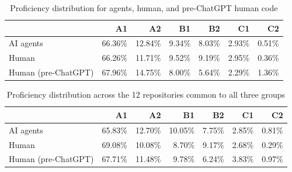\begin{table}[tb]
\centering
\caption{Proficiency distribution for agents, human, and pre-ChatGPT human code}
\label{tab:ai-vs-human-same-projects}
\begin{tabular}{l r r r r r r}
\toprule
 & A1 & A2 & B1 & B2 & C1 & C2 \\
\midrule
AI agents & 66.36\% & 12.84\% & 9.34\% & 8.03\% & 2.93\% & 0.51\% \\
Human & 66.26\% & 11.71\% & 9.52\% & 9.19\% & 2.95\% & 0.36\% \\
Human (pre-ChatGPT) & 67.96\% & 14.75\% & 8.00\% & 5.64\% & 2.29\% & 1.36\% \\
\bottomrule
\end{tabular}
\end{table}


\begin{table}[tb]
\centering
\caption{Proficiency distribution across the 12 repositories common to all three groups}
\label{tab:ai-vs-human-common}
\begin{tabular}{l r r r r r r}
\toprule
 & A1 & A2 & B1 & B2 & C1 & C2 \\
\midrule
AI agents & 65.83\% & 12.70\% & 10.05\% & 7.75\% & 2.85\% & 0.81\% \\
Human & 69.08\% & 10.08\% & 8.70\% & 9.17\% & 2.68\% & 0.29\% \\
Human (pre-ChatGPT) & 67.71\% & 11.48\% & 9.78\% & 6.24\% & 3.83\% & 0.97\% \\
\bottomrule
\end{tabular}
\end{table}
